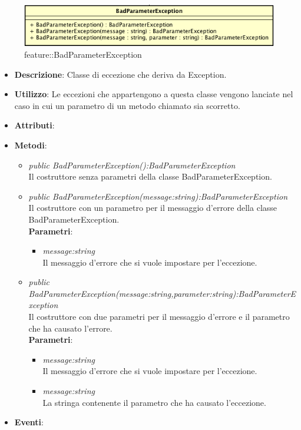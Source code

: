 \label{feature::BadParameterException}
\begin{figure}[ht]
	\centering
	\includegraphics[scale=0.5]{Sezioni/SottosezioniST/img/app/BadParameterException.png}
	\caption{feature::BadParameterException}
\end{figure}

\begin{itemize}
\item \textbf{Descrizione}: Classe di eccezione che deriva da Exception.
\item \textbf{Utilizzo}: Le eccezioni che appartengono a questa classe vengono lanciate nel caso in cui un parametro di un metodo chiamato sia scorretto.
\item \textbf{Attributi}: 
\item \textbf{Metodi}:
	\begin{itemize}
	\item \textit{public BadParameterException():BadParameterException}\\
	Il costruttore senza parametri della classe BadParameterException.
	\item \textit{public BadParameterException(message:string):BadParameterException}\\
	Il costruttore con un parametro per il messaggio d'errore della classe BadParameterException.
			\\ \textbf{Parametri}: \begin{itemize}
			\item \textit{message:string}\\
			Il messaggio d'errore che si vuole impostare per l'eccezione.
			\end{itemize} 
	\item \textit{public BadParameterException(message:string,parameter:string):BadParameterException}\\
	Il costruttore con due parametri per il messaggio d'errore e il parametro che ha causato l'errore.
			\\ \textbf{Parametri}: \begin{itemize}
			\item \textit{message:string}\\
			Il messaggio d'errore che si vuole impostare per l'eccezione.
			\item \textit{message:string}\\
			La stringa contenente il parametro che ha causato l'eccezione.
			\end{itemize} 
	\end{itemize}
\item \textbf{Eventi}:
\end{itemize}